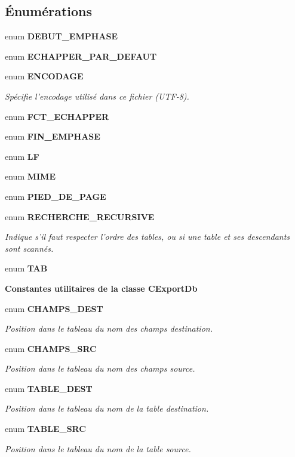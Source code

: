 \subsection*{Énumérations}
\begin{CompactItemize}
\item 
enum \textbf{DEBUT\_\-EMPHASE} 
\item 
enum \textbf{ECHAPPER\_\-PAR\_\-DEFAUT} 
\item 
enum {\bf ENCODAGE} 
\begin{CompactList}\small\item\em Spécifie l'encodage utilisé dans ce fichier (UTF-8). \item\end{CompactList}\item 
enum \textbf{FCT\_\-ECHAPPER} 
\item 
enum \textbf{FIN\_\-EMPHASE} 
\item 
enum \textbf{LF} 
\item 
enum \textbf{MIME} 
\item 
enum \textbf{PIED\_\-DE\_\-PAGE} 
\item 
enum {\bf RECHERCHE\_\-RECURSIVE} 
\begin{CompactList}\small\item\em Indique s'il faut respecter l'ordre des tables, ou si une table et ses descendants sont scannés. \item\end{CompactList}\item 
enum \textbf{TAB} 
\end{CompactItemize}
\begin{Indent}{\bf Constantes utilitaires de la classe CExportDb}\par
\begin{CompactItemize}
\item 
enum {\bf CHAMPS\_\-DEST} 
\begin{CompactList}\small\item\em Position dans le tableau du nom des champs destination. \item\end{CompactList}\item 
enum {\bf CHAMPS\_\-SRC} 
\begin{CompactList}\small\item\em Position dans le tableau du nom des champs source. \item\end{CompactList}\item 
enum {\bf TABLE\_\-DEST} 
\begin{CompactList}\small\item\em Position dans le tableau du nom de la table destination. \item\end{CompactList}\item 
enum {\bf TABLE\_\-SRC} 
\begin{CompactList}\small\item\em Position dans le tableau du nom de la table source. \item\end{CompactList}\end{CompactItemize}
\end{Indent}
